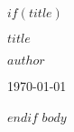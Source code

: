 \documentclass[11pt,a4paper]{article}
\begin{document}
$if(title)$
\begin{titlepage}
    \centering
    \vspace*{2cm}
    {\Huge\bfseries $title$\par}
    \vspace{2cm}
    {\Large\itshape $author$\par}
    \vfill
    {\large \today\par}
\end{titlepage}
$endif$
$body$
\end{document}
